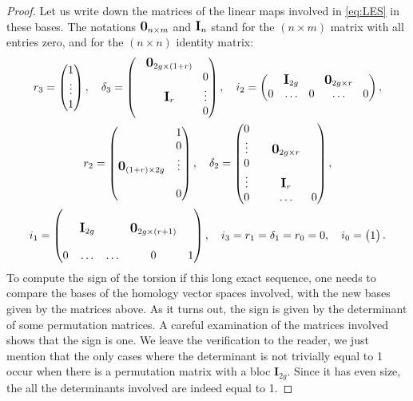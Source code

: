 \documentclass[10pt]{amsart}
\theoremstyle{plain}
\theoremstyle{definition}
\theoremstyle{remark}
\newcommand{\bma}{\begin{pmatrix}}
\newcommand{\ema}{\end{pmatrix}}
\newcommand{\bigzero}{\mbox{\normalfont\large\bfseries 0}}
\newcommand{\bigId}{\mbox{\normalfont\large\bfseries \textrm{I}}}
\numberwithin{equation}{section}
\begin{document}
\begin{proof}
Let us write down the matrices of the linear maps involved in \cref{eq:LES} in these bases. The notations $\bigzero_{n\times m}$ and $\bigId_{n}$ stand for the $(n\times m)$ matrix with all entries zero, and for the $(n \times n)$ identity matrix:
\begin{gather*}
\arraycolsep4.5pt
r_3 = \bma 1 \\ \vdots \\ 1 \ema, \quad \delta_3 = \bma & \begin{matrix} \bigzero_{2g \times (1+r)} \end{matrix} & \\
& & 0 \\
& \begin{matrix} \bigId_r \end{matrix}& \vdots \\
& & 0
\ema,
\quad
i_2 = \bma & \bigId_{2g} & & \bigzero_{2g \times r} & \\
0 &\ldots & 0 &\ldots & 0
\ema,
\\
r_2 = \bma & 1 \\
& 0\\
\bigzero_{(1+r) \times 2g} & \vdots\\
& \\
& 0
\ema,
\quad
\delta_2 = \bma 0 & & & \\
\vdots & & \bigzero_{2g \times r} &\\
0&&& \\
\vdots & & \bigId_r&\\
0 & & \ldots &0
\ema,
\\
i_1 = \bma & & & &\\
& \bigId_{2g} & & \bigzero_{2g \times (r+1)} &\\
& & & &\\
0 &\ldots & \ldots & 0 & 1
\ema,
\quad
i_3 = r_1 = \delta_1 = r_0 = 0,
\quad
i_0 = \bma 1 \ema.
\end{gather*}
To compute the sign of the torsion if this long exact sequence, one needs to compare the bases of the homology vector spaces involved, with the new bases given by the matrices above. As it turns out, the sign is given by the determinant of some permutation matrices. A careful examination of the matrices involved shows that the sign is one. We leave the verification to the reader, we just mention that the only cases where the determinant is not trivially equal to 1 occur when there is a permutation matrix with a bloc $ \textbf{I}_{2g}$. Since it has even size, the all the determinants involved are indeed equal to 1.
\end{proof}
\end{document}
